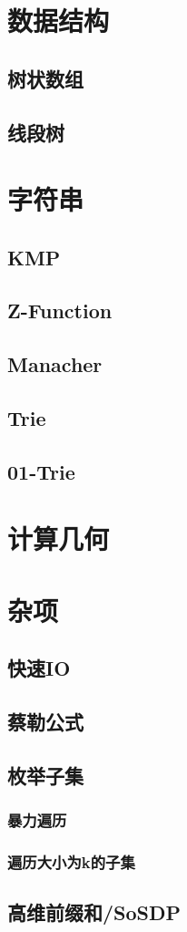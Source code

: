 \documentclass{article}
\begin{document}
\section{数据结构}
\subsection{树状数组}

\subsection{线段树}
\section{字符串}
\subsection{KMP}

\subsection{Z-Function}

\subsection{Manacher}

\subsection{Trie}

\subsection{01-Trie}


\section{计算几何}


\section{杂项}
\subsection{快速IO}

\subsection{蔡勒公式}

\subsection{枚举子集}
\subsubsection{暴力遍历}

\subsubsection{遍历大小为k的子集}

\subsection{高维前缀和/SoSDP}

\end{document}

